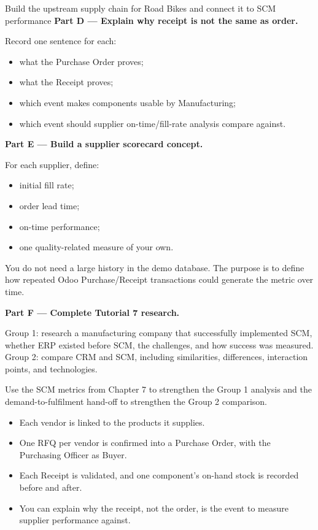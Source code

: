 \begin{labproject}{Build the upstream supply chain for Road Bikes and connect it to SCM performance}
\medskip\noindent\textbf{Part D --- Explain why receipt is not the same as order.}

Record one sentence for each:
\begin{itemize}
  \item what the Purchase Order proves;
  \item what the Receipt proves;
  \item which event makes components usable by Manufacturing;
  \item which event should supplier on-time/fill-rate analysis compare against.
\end{itemize}

\medskip\noindent\textbf{Part E --- Build a supplier scorecard concept.}

For each supplier, define:
\begin{itemize}
  \item initial fill rate;
  \item order lead time;
  \item on-time performance;
  \item one quality-related measure of your own.
\end{itemize}

You do not need a large history in the demo database. The purpose is to define how repeated Odoo Purchase/Receipt transactions could generate the metric over time.

\medskip\noindent\textbf{Part F --- Complete Tutorial 7 research.}

Group 1: research a manufacturing company that successfully implemented SCM, whether ERP existed before SCM, the challenges, and how success was measured.\\
Group 2: compare CRM and SCM, including similarities, differences, interaction points, and technologies.

Use the SCM metrics from Chapter 7 to strengthen the Group 1 analysis and the demand-to-fulfilment hand-off to strengthen the Group 2 comparison.
\end{labproject}

\begin{verification}
\begin{itemize}
  \item Each vendor is linked to the products it supplies.
  \item One RFQ per vendor is confirmed into a Purchase Order, with the Purchasing Officer as Buyer.
  \item Each Receipt is validated, and one component's on-hand stock is recorded before and after.
  \item You can explain why the receipt, not the order, is the event to measure supplier performance against.
\end{itemize}
\end{verification}


